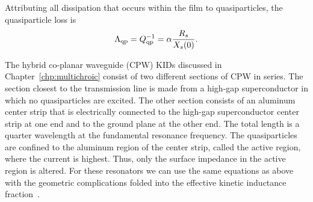 Attributing all dissipation that occurs within the film to quasiparticles, the quasiparticle loss is~\autocite{Zmuidzinas2012ARCMP}
\begin{equation}
\Lambda_{\mathrm{qp}}
  =
  Q_{\mathrm{qp}}^{-1}
  =
  \alpha \frac{R_s}{X_s(0)}.
\label{eqn:resonator.loss_quasiparticle}
\end{equation}

The hybrid co-planar waveguide (CPW) KIDs discussed in Chapter~\ref{chp:multichroic} consist of two different sections of CPW in series.
The section closest to the transmission line is made from a high-gap superconductor in which no quasiparticles are excited.
The other section consists of an aluminum center strip that is electrically connected to the high-gap superconductor center strip at one end and to the ground plane at the other end.
The total length is a quarter wavelength at the fundamental resonance frequency.
The quasiparticles are confined to the aluminum region of the center strip, called the active region, where the current is highest.
Thus, only the surface impedance in the active region is altered.
For these resonators we can use the same equations as above with the geometric complications folded into the effective kinetic inductance fraction~\autocite{Gao2008}.
